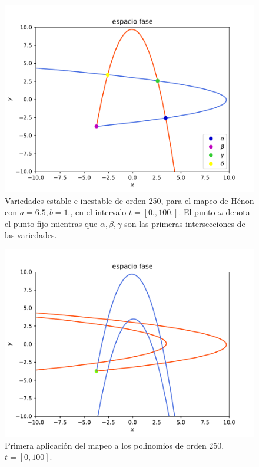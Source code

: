 \documentclass[11pt]{beamer}
\theoremstyle{definition}
\begin{document}
\begin{frame}
\begin{figure}[H]
\centering
\includegraphics[scale=0.5]{rectangulo_fundamental}
\caption{Variedades estable e inestable de orden 250, para el mapeo de Hénon con $a=6.5,b=1.$, en el intervalo $t=[0.,100.]$. El punto $\omega$ denota el punto fijo mientras que $\alpha, \beta, \gamma$ son las primeras intersecciones de las variedades.}
\label{rectangulo0}
\end{figure}
\end{frame}
\begin{frame}
\begin{figure}[H]
\centering
\includegraphics[scale=0.5]{rectangulo1.pdf}
\caption{Primera aplicación del mapeo a los polinomios de orden 250, $t=[0,100]$.}
\label{Rectangulo1}
\end{figure}
\end{frame}
\end{document}
